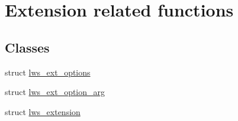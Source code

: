 \hypertarget{group__extensions}{}\section{Extension related functions}
\label{group__extensions}
\subsection*{Classes}
\begin{DoxyCompactItemize}
\item 
struct \hyperlink{structlws__ext__options}{lws\+\_\+ext\+\_\+options}
\item 
struct \hyperlink{structlws__ext__option__arg}{lws\+\_\+ext\+\_\+option\+\_\+arg}
\item 
struct \hyperlink{structlws__extension}{lws\+\_\+extension}
\end{DoxyCompactItemize}
